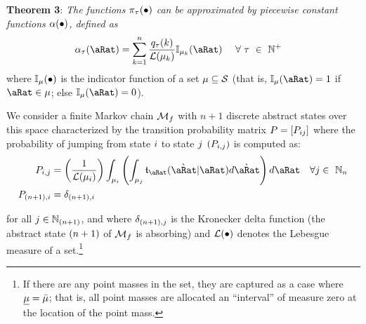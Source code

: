 \documentclass[../BufferStockTheory.tex]{subfiles}\usepackage{ApndxSteadyState}
\begin{document}
  \textbf{Theorem 3}: \textit{The functions $\pi_{\tau}(\bullet)$ can  be approximated by piecewise constant functions $\alpha(\bullet)$, defined as}
  \begin{align}\label{eq:PrbBinNxtFmPntNow}
    \pContAprx_{\tAbs}(\point) &= \sum_{\ptsLoopC=1}^{\StNum} \frac{\pDistDscr_{\tAbs}(\ptsLoopC)}{\Lebes(\SetSub_{\ptsLoopC})} \mathbb{I}_{\SetSub_{\ptsLoopC}}(\point)~~~~\forall~\tAbs~\in~\Nteger^{+}
  \end{align}where $\mathbb{I}_{\mu}(\bullet)$ is the indicator function of a set $\mu \subseteq \mathcal{S}$ (that is, $\mathbb{I}_{\SetSub}(\point) = 1$ if $\point \in \SetSub$; else $\mathbb{I}_{\SetSub}(\point) = 0$).  %


  We consider a finite Markov chain $\mathcal{M}_{f}$ with $n+1$ discrete abstract states over this space characterized by the transition probability matrix $P = [P_{ij}]$ where the probability of jumping from state $i$ to state $j$ $(P_{i,j})$ is computed as:
  \begin{align}
    \PTrns_{\this,\that} &= \left(\frac{1}{\Lebes(\SetSub_{\this})}\right)\int_{\SetSub_{\this}}\left(\int_{\SetSub_{\that}}\trns_{\point}(\Nxt{\point}|\point){d\Nxt{\point}}\right){d\point}~~~\forall\that \in~ \Nteger_{\StNum} \label{eq:thisTOthat}
    \\ \PTrns_{\StPls,\this} &= \delta_{\StPls,\this}\notag
  \end{align}{}
  
\noindent for all $j \in \mathbb{N}_{(n+1)}$, and where $\delta_{(n+1),j}$ is the Kronecker delta function (the abstract state $(n+1)$ of $\mathcal{M}_{f}$ is absorbing) 
  and $\mathcal{L}(\bullet)$ denotes the Lebesgue measure of a set.\footnote{If there are any point masses in the set, they are captured as a case where $\underline{\mu}=\bar{\mu}$; that is, all point masses are allocated an ``interval'' of measure zero at the location of the point mass.}
\end{document}
